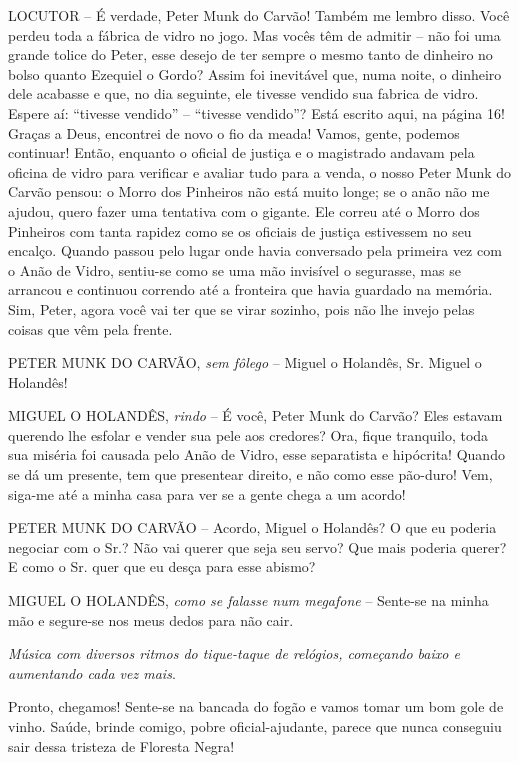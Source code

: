 LOCUTOR -- É verdade, Peter Munk do Carvão! Também me lembro disso. Você
perdeu toda a fábrica de vidro no jogo. Mas vocês têm de admitir -- não
foi uma grande tolice do Peter, esse desejo de ter sempre o mesmo tanto
de dinheiro no bolso quanto Ezequiel o Gordo? Assim foi inevitável que,
numa noite, o dinheiro dele acabasse e que, no dia seguinte, ele tivesse
vendido sua fabrica de vidro. Espere aí: ``tivesse vendido'' --
``tivesse vendido''? Está escrito aqui, na página 16! Graças a Deus,
encontrei de novo o fio da meada! Vamos, gente, podemos continuar!
Então, enquanto o oficial de justiça e o magistrado andavam pela oficina
de vidro para verificar e avaliar tudo para a venda, o nosso Peter Munk
do Carvão pensou: o Morro dos Pinheiros não está muito longe; se o anão
não me ajudou, quero fazer uma tentativa com o gigante. Ele correu até o
Morro dos Pinheiros com tanta rapidez como se os oficiais de justiça
estivessem no seu encalço. Quando passou pelo lugar onde havia
conversado pela primeira vez com o Anão de Vidro, sentiu-se como se uma
mão invisível o segurasse, mas se arrancou e continuou correndo até a
fronteira que havia guardado na memória. Sim, Peter, agora você vai ter
que se virar sozinho, pois não lhe invejo pelas coisas que vêm pela
frente.

PETER MUNK DO CARVÃO, \emph{sem fôlego} -- Miguel o Holandês, Sr. Miguel
o Holandês!

MIGUEL O HOLANDÊS, \emph{rindo} -- É você, Peter Munk do Carvão? Eles
estavam querendo lhe esfolar e vender sua pele aos credores? Ora, fique
tranquilo, toda sua miséria foi causada pelo Anão de Vidro, esse
separatista e hipócrita! Quando se dá um presente, tem que presentear
direito, e não como esse pão-duro! Vem, siga-me até a minha casa para
ver se a gente chega a um acordo!

PETER MUNK DO CARVÃO -- Acordo, Miguel o Holandês? O que eu poderia
negociar com o Sr.? Não vai querer que seja seu servo? Que mais poderia
querer? E como o Sr. quer que eu desça para esse abismo?

MIGUEL O HOLANDÊS, \emph{como se falasse num megafone} -- Sente-se na
minha mão e segure-se nos meus dedos para não cair.

\emph{Música com diversos ritmos do tique-taque de relógios, começando
baixo e aumentando cada vez mais}.

Pronto, chegamos! Sente-se na bancada do fogão e vamos tomar um bom gole
de vinho. Saúde, brinde comigo, pobre oficial-ajudante, parece que nunca
conseguiu sair dessa tristeza de Floresta Negra!

